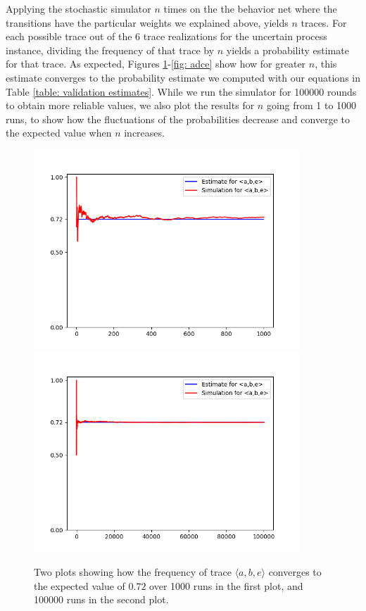 Applying the stochastic simulator $n$ times on the the behavior net where the transitions have the particular weights we explained above, yields $n$ traces.
For each possible trace out of the 6 trace realizations for the uncertain process instance, dividing the frequency of that trace by $n$ yields a probability estimate for that trace.
As expected, Figures \ref{fig: abe}-\ref{fig: adce} show how for greater $n$, this estimate converges to the probability estimate we computed with our equations in Table \ref{table: validation estimates}.
While we run the simulator for 100000 rounds to obtain more reliable values, we also plot the results for $n$ going from 1 to 1000 runs, to show how the fluctuations of the probabilities decrease and converge to the expected value when $n$ increases.

\begin{figure}%
    \centering
    {{\includegraphics[width=10cm]{figures/abe1.png} }}%
    \qquad
   {{\includegraphics[width=10cm]{figures/abe100.png} }}%
    \caption{Two plots showing how the frequency of trace $\langle a,b,e \rangle$ converges to the expected value of $0.72$ over 1000 runs in the first plot, and 100000 runs in the second plot.}%
    \label{fig: abe}%
\end{figure}
